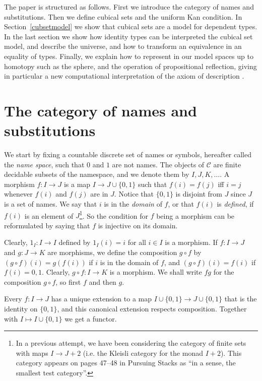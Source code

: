 \documentclass[10pt,a4paper]{article}
\newcommand{\CC}{{\mathcal C}}
\newcommand{\set}[1]{\{#1\}}
\begin{document}
The paper is structured as follows. First we introduce the category of
names and substitutions.  Then we define cubical sets and the uniform
Kan condition.  In Section~\ref{cubsetmodel} we show that cubical sets
are a model for dependent types.  In the last section we show how
identity types can be interpreted the cubical set model, and describe
the universe, and how to transform an equivalence in an equality of
types.  Finally, we explain how to represent in our model spaces up to
homotopy such as the sphere, and the operation of propositional
reflection, giving in particular a new computational interpretation of
the axiom of description \cite{Russell}.

\section{The category of names and substitutions}

 We start by fixing a countable discrete set of names or symbols, hereafter called the \emph{name space},
such that $0$ and $1$ are not names.
The objects of $\CC$ are finite decidable subsets of the namespace,
and we denote them by $I,J,K,\dots$.
A morphism $f:I\to J$ is a map $I \to J\cup \set{0,1}$ such that $f(i) = f(j)$ iff $i=j$ whenever
$f(i)$ and $f(j)$ are in $J$. Notice that $\set{0,1}$ is disjoint from $J$ since $J$ is a set of
names. We say that $i$ is in the \emph{domain} of $f$, or that $f(i)$ is \emph{defined},
if $f(i)$ is an element of $J$\footnote%
{In a previous attempt, we have been considering the category of finite sets
with maps $I \to J+2$ (i.e. the Kleisli category for the monad $I+2$).
This category appears on pages 47--48 in Pursuing Stacks
\cite{Grothendieck} as ``in a sense, the smallest test category''.}.
So the condition for $f$ being a morphism can be reformulated by saying that $f$ is injective on its domain.

Clearly, $1_I : I\to I$ defined by $1_I(i) = i$ for all $i\in I$ is a morphism.
If $f:I\to J$ and $g:J\to K$ are morphisms, we define the composition $g\circ f$ by
$(g\circ f)(i) = g(f(i))$ if $i$ is in the domain of $f$, and $(g\circ f)(i) = f(i)$ if $f(i)= 0,1$.
Clearly, $g\circ f: I\to K$ is a morphism.
We shall write $fg$ for the composition $g\circ f$, so first $f$ and then $g$.

Every $f:I\to J$ has a unique extension to a map $I \cup \set{0,1} \to J\cup \set{0,1}$
that is the identity on $\set{0,1}$, and this canonical extension respects composition.
Together with $I\mapsto I \cup \set{0,1}$ we get a functor.%
\end{document}
